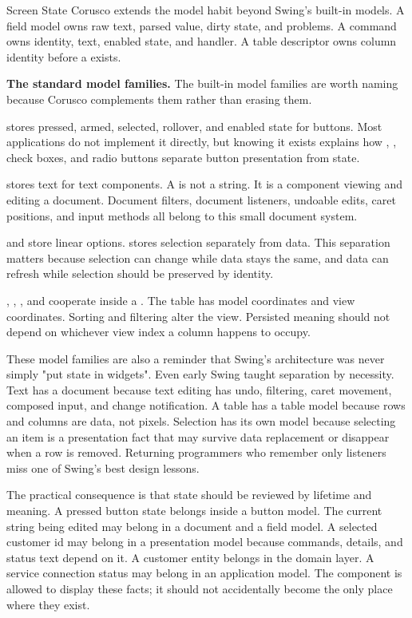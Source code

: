 \begin{coruscobox}{Screen State}
Corusco extends the model habit beyond Swing's built-in models. A field model owns raw text, parsed value, dirty state, and problems. A command owns identity, text, enabled state, and handler. A table descriptor owns column identity before a  exists.
\end{coruscobox}

\textbf{The standard model families.} The built-in model families are worth naming because Corusco complements them rather than erasing them.

 stores pressed, armed, selected, rollover, and enabled state for buttons. Most applications do not implement it directly, but knowing it exists explains how , , check boxes, and radio buttons separate button presentation from state.

 stores text for text components. A  is not a string. It is a component viewing and editing a document. Document filters, document listeners, undoable edits, caret positions, and input methods all belong to this small document system.

 and  store linear options.  stores selection separately from data. This separation matters because selection can change while data stays the same, and data can refresh while selection should be preserved by identity.

, , , and  cooperate inside a . The table has model coordinates and view coordinates. Sorting and filtering alter the view. Persisted meaning should not depend on whichever view index a column happens to occupy.

These model families are also a reminder that Swing's architecture was never simply "put state in widgets". Even early Swing taught separation by necessity. Text has a document because text editing has undo, filtering, caret movement, composed input, and change notification. A table has a table model because rows and columns are data, not pixels. Selection has its own model because selecting an item is a presentation fact that may survive data replacement or disappear when a row is removed. Returning programmers who remember only listeners miss one of Swing's best design lessons.

The practical consequence is that state should be reviewed by lifetime and meaning. A pressed button state belongs inside a button model. The current string being edited may belong in a document and a field model. A selected customer id may belong in a presentation model because commands, details, and status text depend on it. A customer entity belongs in the domain layer. A service connection status may belong in an application model. The component is allowed to display these facts; it should not accidentally become the only place where they exist.


